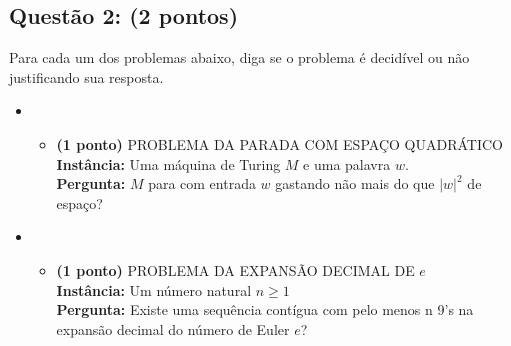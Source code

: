 \documentclass{article}
\begin{document}
\subsection*{Questão 2: (2 pontos)} Para cada um dos problemas abaixo, diga se o problema é
decidível ou não justificando sua resposta.
\begin{itemize}[label={}]
  \item
    \fbox
    {
      \parbox{\textwidth}
      {
        \begin{itemize}
          \item \textbf{(1 ponto)} PROBLEMA DA PARADA COM ESPAÇO QUADRÁTICO\\
                \textbf{Instância:} Uma m\'aquina de Turing $M$ e uma palavra $w$. \\
                \textbf{Pergunta:} $M$ para com entrada $w$ gastando não mais do que $|w|^2$ de espaço?
        \end{itemize}
      }
    }
  \item
    \fbox
    {
      \parbox{\textwidth}
      {
        \begin{itemize}
          \item \textbf{(1 ponto)} PROBLEMA DA EXPANSÃO DECIMAL DE $e$\\
                \textbf{Instância:} Um número natural $n\geq1$ \\
                \textbf{Pergunta:} Existe uma sequência contígua com pelo menos n 9’s na expansão decimal do número de Euler $e$?
        \end{itemize}
      }
    }
\end{itemize}
\end{document}
